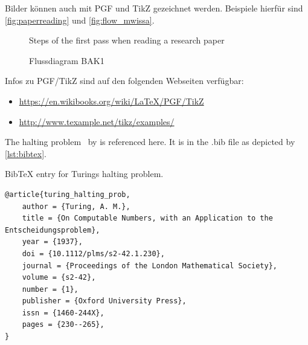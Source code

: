 Bilder können auch mit PGF und TikZ gezeichnet werden.
Beispiele hierfür sind \autoref{fig:paperreading} und \autoref{fig:flow_mwissa}.

\begin{figure}[ht]
    \centering
    
    \caption{Steps of the first pass when reading a research paper}\label{fig:paperreading}
\end{figure}


\begin{figure}[ht]
    \centering
    
    \caption{Flussdiagram BAK1}\label{fig:flow_mwissa}
\end{figure}

Infos zu PGF/TikZ sind auf den folgenden Webseiten verfügbar:
\begin{itemize}
    \item \url{https://en.wikibooks.org/wiki/LaTeX/PGF/TikZ}
    \item \url{http://www.texample.net/tikz/examples/}
\end{itemize}




The halting problem~\cite{turing_halting_prob} by \citeauthor{turing_halting_prob} is referenced here. It is in the .bib file as depicted by \cref{lst:bibtex}.


\begin{listing}[tbh]
\caption{BibTeX entry for Turings halting problem.}\label{lst:bibtex}
\begin{verbatim}
@article{turing_halting_prob,
    author = {Turing, A. M.},
    title = {On Computable Numbers, with an Application to the Entscheidungsproblem},
    year = {1937},
    doi = {10.1112/plms/s2-42.1.230},
    journal = {Proceedings of the London Mathematical Society},
    volume = {s2-42},
    number = {1},
    publisher = {Oxford University Press},
    issn = {1460-244X},
    pages = {230--265},
}
\end{verbatim}
\end{listing}
